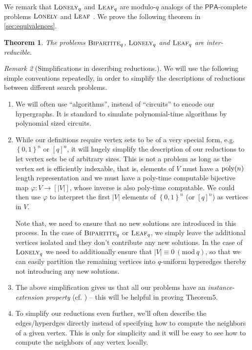 \documentclass[10pt,a4paper]{article}
\newtheorem{theorem}{Theorem}
\theoremstyle{definition}
\theoremstyle{remark}
\newtheorem{remark}[theorem]{Remark}
\newcommand{\inparen}[1]{\left ( #1 \right )}
\renewcommand{\mod}[1]{~\inparen{\mathrm{mod}~#1}}
\def\set#1{\left\{#1\right\}}
\newcommand{\bit}{\ensuremath{\set{0,1}}}
\DeclareMathOperator*{\poly}{\ensuremath\mathrm{poly}}
\newcommand{\class}[1]{\ensuremath{\mathsf{#1}}\xspace}
\newcommand{\PPA}{\class{PPA}}
\newcommand{\qnum}{q}
\newcommand{\leafq}{\ensuremath\textsc{Leaf}_{\qnum}}
\newcommand{\lonelyq}{\ensuremath\textsc{Lonely}_{\qnum}}
\newcommand{\bipartiteq}{\ensuremath{\textsc{Bipartite}_\qnum}}
\newcommand{\leaf}{\ensuremath\textsc{Leaf}}
\newcommand{\lonely}{\ensuremath\textsc{Lonely}}
\newcommand{\bipartite}{\ensuremath{\textsc{Bipartite}}}
\begin{document}
\noindent We remark that $\lonely_q$ and $\leaf_q$ are modulo-$q$ analogs of the $\PPA$-complete problems $\lonely$ and $\leaf$ \cite{r33,r5}. We prove the following theorem in \autoref{sec:equivalences}.

\begin{theorem}\label{thm:PPAqEquivalentProblems}
The problems $\bipartiteq$, $\lonelyq$ and $\leafq$ are inter-reducible.
\end{theorem}

\begin{remark}[Simplifications in describing reductions.]\label{rem:simplifications}
	We will use the following simple conventions repeatedly, in order to simplify the descriptions of reductions between different search problems.
	\begin{enumerate}
						\item We will often use ``algorithms'', instead of ``circuits'' to encode our hypergraphs. It is standard to simulate polynomial-time algorithms by polynomial sized circuits.
		\item While our definitions require vertex sets to be of a very special form, e.g. $\bit^n$ or $[q]^n$, it will hugely simplify the description of our reductions to let vertex sets be of arbitrary sizes. This is not a problem as long as the vertex set is efficiently indexable, that is, elements of $V$ must have a $\poly(n)$ length representation and we must have a poly-time computable bijective map $\varphi : V \to [|V|]$, whose inverse is also poly-time computable. We could then use $\varphi$ to interpret the first $|V|$ elements of $\bit^n$ (or $[q]^n$) as vertices in $V$.

		Note that, we need to ensure that no new solutions are introduced in this process. In the case of $\bipartite_q$ or $\leaf_q$, we simply leave the additional vertices isolated and they don't contribute any new solutions. In the case of $\lonely_q$ we need to additionally ensure that $|V| \equiv 0 \mod{q}$, so that we can easily partition the remaining vertices into $q$-uniform hyperedges thereby not introducing any new solutions.
		\item The above simplification gives us that all our problems have an {\em instance-extension property} (cf. \cite{r10}) -- this will be helpful in proving Theorem5.
		\item To simplify our reductions even further, we'll often describe the edges/hyperdges directly instead of specifying how to compute the neighbors of a given vertex. This is only for simplicity and it will be easy to see how to compute the neighbors of any vertex locally.
	\end{enumerate}
\end{remark}
\end{document}
